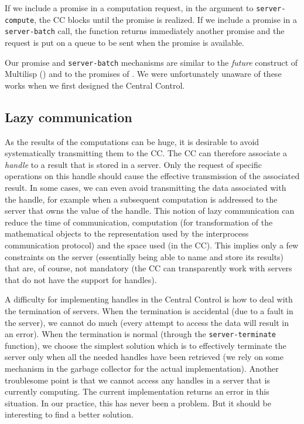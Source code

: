 \documentclass {article}
\begin{document}
If we include a promise in a computation request, in the argument to 
{\tt server-compute}, the CC blocks until the promise is realized. If we
include a promise in a {\tt server-batch} call, the function returns
immediately another promise and the request is put on a queue to be sent when
the promise is available.

Our promise and {\tt server-batch} mechanisms are similar to the {\sl future}
construct of Multilisp (\cite{MULTILISP}) and to the promises of 
\cite{PROMISES}. We were unfortunately unaware of these works when we first
designed the Central Control.

\subsection{ Lazy communication }

As the results of the computations can be huge, it is desirable to avoid
systematically transmitting them to the CC. 
The CC can therefore associate a {\sl handle} to a result that is stored in
a server.
Only the request of specific operations on this handle should cause the
effective transmission of the associated result. 
In some cases, we can even avoid transmitting the data associated with the
handle, for example when a subsequent computation  is addressed to the
server that owns the value of the handle.
This notion of lazy communication can reduce the time of communication,
computation (for transformation of the mathematical objects to the 
representation used by the interprocess communication protocol) and the space
used (in the CC). This implies only a few  constraints on the server
(essentially being able to name and store its results) that are, of course, not
mandatory (the CC can transparently work with servers that do not have the
support for handles). 

A difficulty for implementing handles in the Central Control is how to deal
with the termination of servers. When the termination is accidental (due to a
fault in the server), we cannot do much (every attempt to access the data
will result in an error).
When the termination is normal (through the {\tt server-terminate} function),
we choose the simplest solution which is  to effectively terminate the server
only when all the needed handles have been retrieved (we rely on some
mechanism in the garbage collector for the actual implementation).
Another troublesome point is that we cannot access any handles in a server
that is currently computing. The current implementation returns an error in
this situation. In our practice, this has never been a problem. But it should
be interesting to find a better solution.
\end{document}
